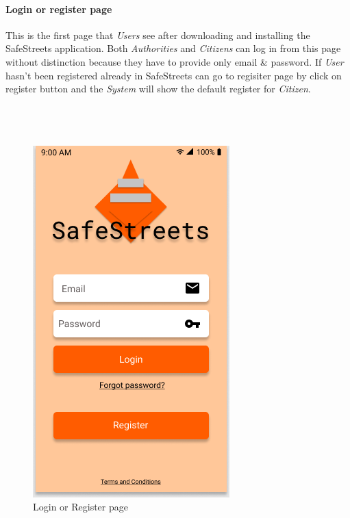 \documentclass{article}
\begin{document}
\paragraph{Login or register page}
This is the first page that \textit{Users} see after downloading and installing the SafeStreets 
application. Both \textit{Authorities} and \textit{Citizens} can log in from this page without 
distinction because they have to provide only email \& password. If \textit{User} hasn't been registered
already in SafeStreets can go to regisiter page by click on register button and the \textit{System} will
show the default register for \textit{Citizen}.
\\
\\
\\
\\
\begin{figure}[H]
    \centering
    \includegraphics[scale=0.5]{img/mockups/login.png}
    \caption{Login or Register page}
\end{figure}

\clearpage
\end{document}

